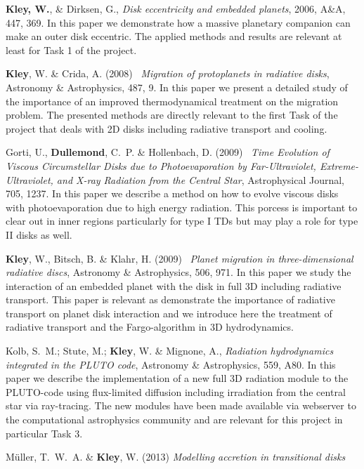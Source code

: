 \documentclass[10pt,fleqn,twoside]{article}
\begin{document}
\begin{literature}
\item {\bf Kley, W.}, \& Dirksen, G., {\em Disk eccentricity and embedded
    planets}, 2006, A\&A, 447, 369. In this paper we
  demonstrate how a massive planetary companion can make an outer disk eccentric. The applied
  methods and results are relevant at least for Task 1 of the project.
\item
 {\bf Kley}, W. \& {Crida}, A. (2008) \, {\it Migration of protoplanets in radiative disks},
   Astronomy \& Astrophysics, 487, 9.
  In this paper we present a detailed study of the importance of an improved thermodynamical
  treatment on the migration problem. The presented methods are directly relevant to the
  first Task of the project that deals with 2D disks including radiative transport and cooling.
\item {Gorti}, U., {\bf Dullemond}, C.~P. \& {Hollenbach}, D. (2009) \,
  {\it Time Evolution of Viscous Circumstellar Disks due to Photoevaporation by Far-Ultraviolet, 
   Extreme-Ultraviolet, and X-ray Radiation from the Central Star},
  Astrophysical Journal, 705, 1237.
  In this paper we describe a method on how to evolve viscous disks with photoevaporation
  due to high energy radiation. This porcess is important to clear out in inner regions particularly
  for type I TDs but may play a role for type II disks as well.
\item
  {\bf Kley}, W., {Bitsch}, B. \& {Klahr}, H. (2009) \,
  {\it Planet migration in three-dimensional radiative discs},
  Astronomy \& Astrophysics, 506, 971. 
  In this paper we study the interaction of an embedded planet with the disk in full 3D including radiative
  transport. This paper is relevant as demonstrate the importance of radiative transport on 
  planet disk interaction and we introduce here the treatment of radiative transport and the Fargo-algorithm
  in 3D hydrodynamics.  
\item
  {Kolb}, S.~M.; {Stute}, M.; {\bf Kley}, W. \& {Mignone}, A., 
  {\it Radiation hydrodynamics integrated in the PLUTO code},
   Astronomy \& Astrophysics, 559, A80. In this paper we describe the implementation of a new
   full 3D radiation module to the PLUTO-code using flux-limited diffusion including irradiation
   from the central star via ray-tracing. The new modules have been made available via webserver to
   the computational astrophysics community and are relevant for this project in particular Task 3.
\item
  {M{\"u}ller}, T.~W.~A. \& {\bf Kley}, W. (2013) {\it Modelling accretion in transitional disks}

\end{literature}
\end{document}
